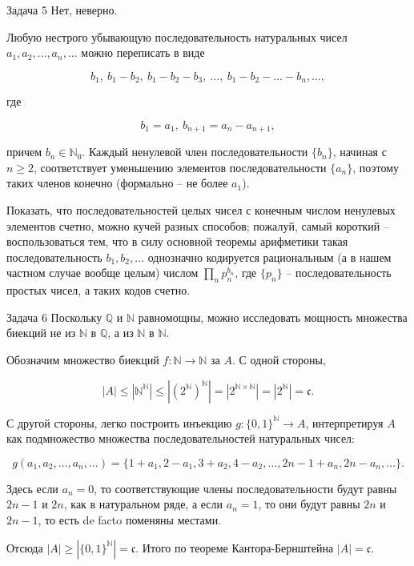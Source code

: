 \documentclass{article}
\newcommand{\abs}[1]{\left\lvert#1\right\rvert}
\newcommand{\N}{\mathbb{N}}
\newcommand{\Q}{\mathbb{Q}}
\newcommand{\continuum}{\mathfrak{c}}
\begin{document}
	\begin{section}{Задача 5}
		Нет, неверно.

		Любую нестрого убывающую последовательность натуральных чисел $a_1, a_2, \dots, a_n, \dots$ можно переписать в виде

		\begin{equation*}
			b_1, \ b_1 - b_2, \ b_1 - b_2 - b_3, \ \dots, \ b_1 - b_2 - \dots - b_n, \dots,
		\end{equation*}

		где

		\begin{equation*}
			b_1 = a_1, \ b_{n+1} = a_n - a_{n+1},
		\end{equation*}

		причем $b_n \in \N_0$. Каждый ненулевой член последовательности $\{b_n\}$, начиная с $n \ge 2$, соответствует уменьшению элементов последовательности $\{a_n\}$, поэтому таких членов конечно (формально -- не более $a_1$).

		Показать, что последовательностей целых чисел с конечным числом ненулевых элементов счетно, можно кучей разных способов; пожалуй, самый короткий -- воспользоваться тем, что в силу основной теоремы арифметики такая последовательность $b_1, b_2, \dots$ однозначно кодируется рациональным (а в нашем частном случае вообще целым) числом $\prod_n p_n^{b_n}$, где $\{p_n\}$ -- последовательность простых чисел, а таких кодов счетно.
	\end{section}

	\begin{section}{Задача 6}
		Поскольку $\Q$ и $\N$ равномощны, можно исследовать мощность множества биекций не из $\N$ в $\Q$, а из $\N$ в $\N$.

		Обозначим множество биекций $f: \N \to \N$ за $A$. С одной стороны,

		\begin{equation*}
			\abs{A} \le \abs{\N^{\N}} \le \abs{(2^{\N})^{\N}} = \abs{2^{\N \times \N}} = \abs{2^{\N}} = \continuum.
		\end{equation*}

		С другой стороны, легко построить инъекцию $g: \{0, 1\}^{\N} \to A$, интерпретируя $A$ как подмножество множества последовательностей натуральных чисел:

		\begin{equation*}
			g(a_1, a_2, \dots, a_n, \dots) = \{1 + a_1, 2 - a_1, 3 + a_2, 4 - a_2, \dots, 2n - 1 + a_n, 2n - a_n, \dots\}.
		\end{equation*}

		Здесь если $a_n = 0$, то соответствующие члены последовательности будут равны $2n-1$ и $2n$, как в натуральном ряде, а если $a_n = 1$, то они будут равны $2n$ и $2n-1$, то есть de facto поменяны местами.

		Отсюда $\abs{A} \ge \abs{\{0, 1\}^{\N}} = \continuum$. Итого по теореме Кантора-Бернштейна $\abs{A} = \continuum$.
	\end{section}
\end{document}
